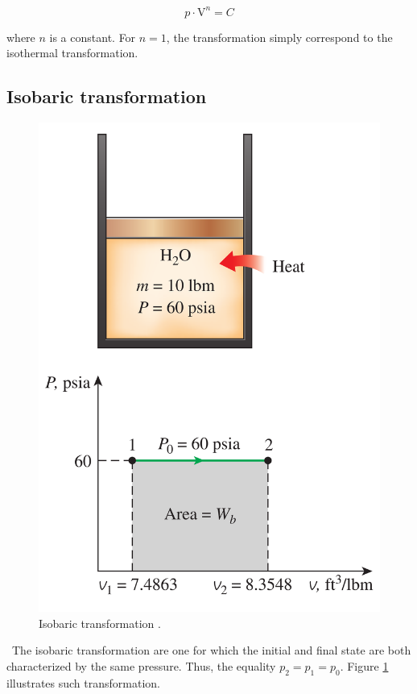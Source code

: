 \begin{equation}
  p\cdot \mathrm{V}^n = C \label{eq:C2_5_poly}
\end{equation}

where $n$ is a constant. For $n=1$, the transformation simply correspond to the isothermal transformation.
 

\subsection{Isobaric transformation}
\begin{figure}
  \centering
  \includegraphics{isoP.png}
  \caption{Isobaric transformation \cite{2015}.}
  \label{fig:C2_5_isoB}
\end{figure}

\quad\ The isobaric transformation are one for which the initial and final state are both characterized by the same pressure. Thus, the equality \(p_2 = p_1 = p_0\). Figure \ref{fig:C2_5_isoB} illustrates such transformation.

